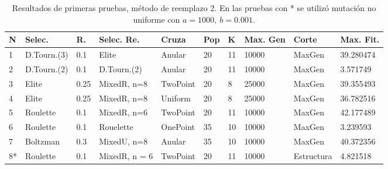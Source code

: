 \documentclass[11pt,a4paper]{article}
\begin{document}
\begin{table}[h]
\centering
\hspace*{-0.9cm}
\begin{tabular}{|l|l|l|l|l|l|l|l|l|l|}
\hline
N & Selec. & R. & Selec. Re. & Cruza & Pop & K & Max. Gen & Corte & Max. Fit. \\ \hline
1 & D.Tourn.(3) & 0.1 & Elite & Anular & 20 & 11 & 10000 & MaxGen & 39.280474 \\ \hline
2 & D.Tourn.(2) & 0.1 & D.Tourn.(2) & Anular & 20 & 11 & 10000 & MaxGen & 3.571749 \\ \hline
3 & Elite & 0.25 & MixedR, n=8 & TwoPoint & 20 & 8 & 25000 & MaxGen & 39.355493 \\ \hline
4 & Elite & 0.25 & MixedR, n=8 & Uniform & 20 & 8 & 25000 & MaxGen & 36.782516 \\ \hline
5 & Roulette & 0.1 & MixedR, n=6 & TwoPoint & 20 & 11 & 10000 & MaxGen & 42.177489 \\ \hline
6 & Roulette & 0.1 & Rouelette & OnePoint & 35 & 10 & 10000 & MaxGen & 3.239593 \\ \hline
7 & Boltzman & 0.3 & MixedU, n=8 & Anular & 35 & 10 & 10000 & MaxGen & 40.372356 \\ \hline
8* & Roulette & 0.1 & MixedR, n = 6 & TwoPoint & 20 & 11 & 10000 & Estructura & 4.821518 \\ \hline

\end{tabular}
\caption{Resultados de primeras pruebas, método de reemplazo 2. En las pruebas con * se utilizó mutación no uniforme con $a=1000, \ b =0.001$.}
\label{table:prueba1-met2}
\end{table}
\end{document}
